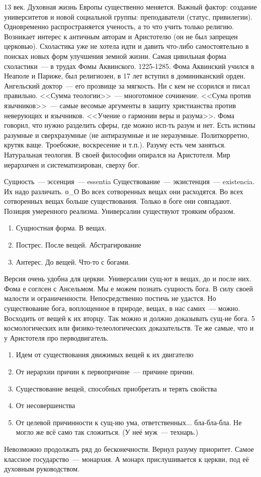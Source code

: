 13 век. Духовная жизнь Европы существенно меняется. Важный фактор: создание университетов и новой социальной группы: преподаватели (статус, привилегии). Одновременно распространяется ученость, а то что учить только религию. Возникает интерес к античным авторам и Аристотелю (он не был запрещен церковью). Схоластика уже не хотела идти и давить что-либо самостоятельно в поисках новых форм улучшения земной жизни. Самая цивильная форма схоластики~--- в трудах Фомы Аквинского. 1225-1285. Фома Аквинский учился в Неаполе и Париже, был религиозен, в 17 лет вступил в доминиканский орден. Ангельский доктор~--- его прозвище за мягкость. Ни с кем не ссорился и писал правильно. <<Сумма теологии>>~--- многотомное сочинение. <<Сума против язычников>>~--- самые весомые аргументы в защиту христианства против неверующих и язычников. <<Учение о гармонии веры и разума>>. Фома говорил, что нужно разделить сферы, где можно исп-ть разум и нет. Есть истины разумные и сверхразумные (не антиразумные и не неразумные. Политкорретно, крутяк ваще. Троебожие, воскресение и т.п.). Разуму есть чем заняться. Натуральная теология. В своей философии опирался на Аристотеля. Мир иерархичен и систематизирован, сверху бог.

Сущность~--- эссенция~--- essentia
Существование~--- экзистенция~--- existencia. Их надо различать. о\_О
Во всех сотворенных вещах они расходятся. Во всех сотворенных вещах больше существования. Только в боге они совпадают. Позиция умеренного реализма. Универсалии существуют трояким образом.

\begin{enumerate}
	\item Сущностная форма. В вещах.
	\item Пострес. После вещей. Абстрагирование
	\item Антерес. До вещей. Что-то с богами.
\end{enumerate}Версия очень удобна для церкви. Универсалии сущ-ют в вещах, до и после них.
Фома е соглсен с Ансельмом. Мы е можем познать сущность бога. В силу своей малости и ограниченности. Непосредственно постичь не удастся. Но существование бога, воплощенное в природе, вещах, в нас самих~--- можно. Восходить от вещей к их вторцу. Так можно и должно доказывать сущ-ие бога. 5 космологических или физико-телеологических доказательств. Те же самые, что и у Аристотеля про перводвигатель.

\begin{enumerate}
	\item Идем от существования движимых вещей к их двигателю
	\item От иерархии причин к первопричине~--- причине причин.
	\item Существование вещей, способных приобретать и терять свойства
	\item От несовершенства
	\item От целевой причинности к сущ-ию ума, ответственных... бла-бла-бла. Не могло же всё само так сложиться. (У неё муж~--- технарь.)
\end{enumerate}
Невозможно продолжать ряд до бесконечности.
Вернул разуму приоритет.
Самое классное государство~--- монархия. А монарх прислушивается к церкви, под её духовным руководством.


